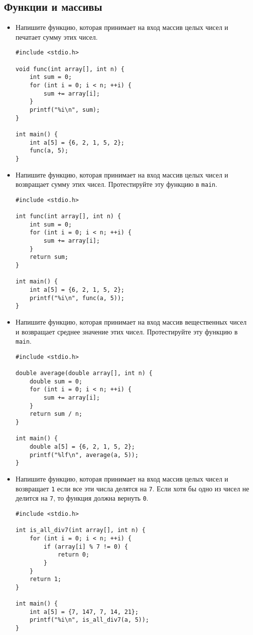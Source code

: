 \documentclass{article}
\begin{document}
\subsection*{Функции и массивы}
\begin{itemize}
\item Напишите функцию, которая принимает на вход массив целых чисел и печатает сумму этих чисел.
\begin{lstlisting}[backgroundcolor = \color{solcolor}]
#include <stdio.h>

void func(int array[], int n) {
    int sum = 0;
    for (int i = 0; i < n; ++i) {
        sum += array[i];
    }
    printf("%i\n", sum);
}

int main() {
    int a[5] = {6, 2, 1, 5, 2};
    func(a, 5);
}
\end{lstlisting}

\newpage
\item Напишите функцию, которая принимает на вход массив целых чисел и возвращает сумму этих чисел. Протестируйте эту функцию в \texttt{main}.
\begin{lstlisting}[backgroundcolor = \color{solcolor}]
#include <stdio.h>

int func(int array[], int n) {
    int sum = 0;
    for (int i = 0; i < n; ++i) {
        sum += array[i];
    }
    return sum;
}

int main() {
    int a[5] = {6, 2, 1, 5, 2};
    printf("%i\n", func(a, 5));
}
\end{lstlisting}
\item Напишите функцию, которая принимает на вход массив вещественных чисел и возвращает среднее значение этих чисел. Протестируйте эту функцию в \texttt{main}.
\begin{lstlisting}[backgroundcolor = \color{solcolor}]
#include <stdio.h>

double average(double array[], int n) {
    double sum = 0;
    for (int i = 0; i < n; ++i) {
        sum += array[i];
    }
    return sum / n;
}

int main() {
    double a[5] = {6, 2, 1, 5, 2};
    printf("%lf\n", average(a, 5));
}
\end{lstlisting}
\item Напишите функцию, которая принимает на вход массив целых чисел и возвращает \texttt{1} если все эти числа делятся на \texttt{7}. Если хотя бы одно из чисел не делится на \texttt{7}, то функция должна вернуть \texttt{0}.
\begin{lstlisting}[backgroundcolor = \color{solcolor}]
#include <stdio.h>

int is_all_div7(int array[], int n) {
    for (int i = 0; i < n; ++i) {
        if (array[i] % 7 != 0) {
            return 0;
        }
    }
    return 1;
}

int main() {
    int a[5] = {7, 147, 7, 14, 21};
    printf("%i\n", is_all_div7(a, 5));
}
\end{lstlisting}
\end{itemize}
\end{document}
